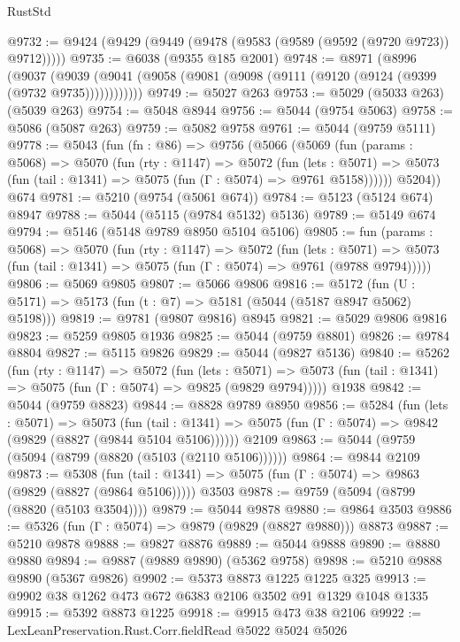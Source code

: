 \begin{lexlean}{RustStd}
\begin{coremodule}
@9732 := @9424 (@9429 (@9449 (@9478 (@9583 (@9589 (@9592 (@9720 @9723)) @9712)))))
@9735 := @6038 (@9355 @185 @2001)
@9748 := @8971
    (@8996
      (@9037 (@9039 (@9041 (@9058 (@9081 (@9098 (@9111 (@9120 (@9124 (@9399 (@9732 @9735))))))))))))
@9749 := @5027 @263
@9753 := @5029 (@5033 @263) (@5039 @263)
@9754 := @5048 @8944
@9756 := @5044 (@9754 @5063)
@9758 := @5086 (@5087 @263)
@9759 := @5082 @9758
@9761 := @5044 (@9759 @5111)
@9778 := @5043
    (fun (fn : @86) =>
    @9756
      (@5066
        (@5069
          (fun (params : @5068) =>
          @5070
            (fun (rty : @1147) =>
            @5072
              (fun (lets : @5071) =>
              @5073 (fun (tail : @1341) => @5075 (fun (Γ : @5074) => @9761 @5158))))))
        @5204))
    @674
@9781 := @5210 (@9754 (@5061 @674))
@9784 := @5123 (@5124 @674) @8947
@9788 := @5044 (@5115 (@9784 @5132) @5136)
@9789 := @5149 @674
@9794 := @5146 (@5148 @9789 @8950 @5104 @5106)
@9805 := fun (params : @5068) =>
  @5070
    (fun (rty : @1147) =>
    @5072
      (fun (lets : @5071) =>
      @5073 (fun (tail : @1341) => @5075 (fun (Γ : @5074) => @9761 (@9788 @9794)))))
@9806 := @5069 @9805
@9807 := @5066 @9806
@9816 := @5172 (fun (U : @5171) => @5173 (fun (t : @7) => @5181 (@5044 (@5187 @8947 @5062) @5198)))
@9819 := @9781 (@9807 @9816) @8945
@9821 := @5029 @9806 @9816
@9823 := @5259 @9805 @1936
@9825 := @5044 (@9759 @8801)
@9826 := @9784 @8804
@9827 := @5115 @9826
@9829 := @5044 (@9827 @5136)
@9840 := @5262
    (fun (rty : @1147) =>
    @5072
      (fun (lets : @5071) =>
      @5073 (fun (tail : @1341) => @5075 (fun (Γ : @5074) => @9825 (@9829 @9794)))))
    @1938
@9842 := @5044 (@9759 @8823)
@9844 := @8828 @9789 @8950
@9856 := @5284
    (fun (lets : @5071) =>
    @5073
      (fun (tail : @1341) => @5075 (fun (Γ : @5074) => @9842 (@9829 (@8827 (@9844 @5104 @5106))))))
    @2109
@9863 := @5044 (@9759 (@5094 (@8799 (@8820 (@5103 (@2110 @5106))))))
@9864 := @9844 @2109
@9873 := @5308
    (fun (tail : @1341) => @5075 (fun (Γ : @5074) => @9863 (@9829 (@8827 (@9864 @5106)))))
    @3503
@9878 := @9759 (@5094 (@8799 (@8820 (@5103 @3504))))
@9879 := @5044 @9878
@9880 := @9864 @3503
@9886 := @5326 (fun (Γ : @5074) => @9879 (@9829 (@8827 @9880))) @8873
@9887 := @5210 @9878
@9888 := @9827 @8876
@9889 := @5044 @9888
@9890 := @8880 @9880
@9894 := @9887 (@9889 @9890) (@5362 @9758)
@9898 := @5210 @9888 @9890 (@5367 @9826)
@9902 := @5373 @8873 @1225 @1225 @325
@9913 := @9902 @38 @1262 @473 @672 @6383 @2106 @3502 @91 @1329 @1048 @1335
@9915 := @5392 @8873 @1225
@9918 := @9915 @473 @38 @2106
@9922 := LexLeanPreservation.Rust.Corr.fieldRead @5022 @5024 @5026

\end{coremodule}
\end{lexlean}
